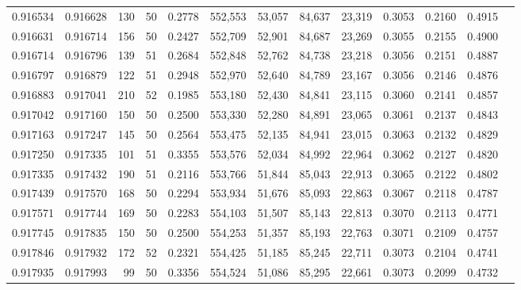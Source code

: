 \begin{tabular}{rrrrrrrrrrrrr}
0.916534 & 0.916628 &   130 &  50 &                                     0.2778 & 552,553 &  53,057 &  84,637 &  23,319 & 0.3053 & 0.2160 & 0.4915 \\
0.916631 & 0.916714 &   156 &  50 &                                     0.2427 & 552,709 &  52,901 &  84,687 &  23,269 & 0.3055 & 0.2155 & 0.4900 \\
0.916714 & 0.916796 &   139 &  51 &                                     0.2684 & 552,848 &  52,762 &  84,738 &  23,218 & 0.3056 & 0.2151 & 0.4887 \\
0.916797 & 0.916879 &   122 &  51 &                                     0.2948 & 552,970 &  52,640 &  84,789 &  23,167 & 0.3056 & 0.2146 & 0.4876 \\
0.916883 & 0.917041 &   210 &  52 &                                     0.1985 & 553,180 &  52,430 &  84,841 &  23,115 & 0.3060 & 0.2141 & 0.4857 \\
0.917042 & 0.917160 &   150 &  50 &                                     0.2500 & 553,330 &  52,280 &  84,891 &  23,065 & 0.3061 & 0.2137 & 0.4843 \\
0.917163 & 0.917247 &   145 &  50 &                                     0.2564 & 553,475 &  52,135 &  84,941 &  23,015 & 0.3063 & 0.2132 & 0.4829 \\
0.917250 & 0.917335 &   101 &  51 &                                     0.3355 & 553,576 &  52,034 &  84,992 &  22,964 & 0.3062 & 0.2127 & 0.4820 \\
0.917335 & 0.917432 &   190 &  51 &                                     0.2116 & 553,766 &  51,844 &  85,043 &  22,913 & 0.3065 & 0.2122 & 0.4802 \\
0.917439 & 0.917570 &   168 &  50 &                                     0.2294 & 553,934 &  51,676 &  85,093 &  22,863 & 0.3067 & 0.2118 & 0.4787 \\
0.917571 & 0.917744 &   169 &  50 &                                     0.2283 & 554,103 &  51,507 &  85,143 &  22,813 & 0.3070 & 0.2113 & 0.4771 \\
0.917745 & 0.917835 &   150 &  50 &                                     0.2500 & 554,253 &  51,357 &  85,193 &  22,763 & 0.3071 & 0.2109 & 0.4757 \\
0.917846 & 0.917932 &   172 &  52 &                                     0.2321 & 554,425 &  51,185 &  85,245 &  22,711 & 0.3073 & 0.2104 & 0.4741 \\
0.917935 & 0.917993 &    99 &  50 &                                     0.3356 & 554,524 &  51,086 &  85,295 &  22,661 & 0.3073 & 0.2099 & 0.4732 \\

\end{tabular}
